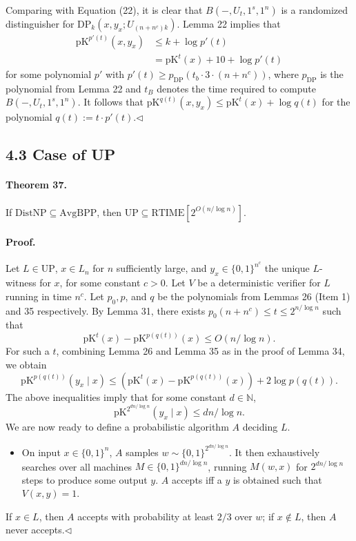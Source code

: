 \documentclass[10pt,a4paper]{article}
\begin{document}
Comparing with Equation (22), it is clear that $B(-,U_t,1^s,1^n)$ is a randomized distinguisher for $\mathrm{DP}_k(x,y_x;U_{(n+n^c)k})$. Lemma 22 implies that
\begin{align*}
\mathrm{pK}^{p'(t)}(x,y_x)&\leq k+\log p'(t)\\
&=\mathrm{pK}^t(x)+10+\log p'(t)
\end{align*}
for some polynomial $p'$ with $p'(t)\geq p_{\mathrm{DP}}(t_b\cdot3\cdot(n+n^c))$, where $p_{\mathrm{DP}}$ is the polynomial from Lemma 22 and $t_B$ denotes the time required to compute $B(-,U_t,1^s,1^n)$. It follows that $\mathrm{pK}^{q(t)}(x,y_x)\leq\mathrm{pK}^t(x)+\log q(t)$ for the polynomial $q(t):=t\cdot p'(t)$.\hfill$\triangleleft$
\subsection*{4.3 Case of UP}

\paragraph{Theorem 37.} If $\mathrm{DistNP}\subseteq\mathrm{AvgBPP}$, then $\mathrm{UP}\subseteq\mathrm{RTIME}[2^{O(n/\log n)}]$.

\paragraph{Proof.} Let $L\in\mathrm{UP}$, $x\in L_n$ for $n$ sufficiently large, and $y_x\in\{0,1\}^{n^c}$ the unique $L$-witness for $x$, for some constant $c>0$. Let $V$ be a deterministic verifier for $L$ running in time $n^c$. Let $p_0,p$, and $q$ be the polynomials from Lemmas 26 (Item 1) and 35 respectively.
By Lemma 31, there exists $p_0(n+n^c)\leq t\leq2^{n/\log n}$ such that
\[\mathrm{pK}^t(x)-\mathrm{pK}^{p(q(t))}(x)\leq O(n/\log n).\]
For such a $t$, combining Lemma 26 and Lemma 35 as in the proof of Lemma 34, we obtain
\[\mathrm{pK}^{p(q(t))}(y_x\mid x)\leq(\mathrm{pK}^t(x)-\mathrm{pK}^{p(q(t))}(x))+2\log p(q(t)).\]
The above inequalities imply that for some constant $d\in\mathbb N$,
\[\mathrm{pK}^{2^{dn/\log n}}(y_x\mid x)\leq dn/\log n.\]
We are now ready to define a probabilistic algorithm $A$ deciding $L$.
\begin{itemize}
\item On input $x\in\{0,1\}^n$, $A$ samples $w\sim\{0,1\}^{2^{dn/\log n}}$. It then exhaustively searches over all machines $M\in\{0,1\}^{dn/\log n}$, running $M(w,x)$ for $2^{dn/\log n}$ steps to produce some output $y$. $A$ accepts iff a $y$ is obtained such that $V(x,y)=1$.
\end{itemize}
If $x\in L$, then $A$ accepts with probability at least $2/3$ over $w$; if $x\notin L$, then $A$ never accepts.\hfill$\triangleleft$
\end{document}
